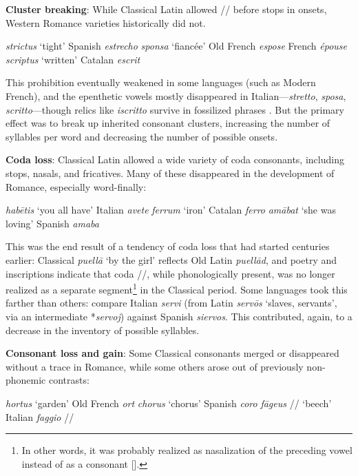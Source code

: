 \documentclass[12pt,twoside]{article}
\newcommand{\ipa}[1]{/\textipa{#1}/}
\newcommand{\ipab}[1]{[\textipa{#1}]}
\newcommand{\yields}{\textrightarrow}
\begin{document}
\textbf{Cluster breaking}: While Classical Latin allowed \ipa{s} before stops in onsets, Western Romance varieties historically did not.

\begin{exe}
\ex \emph{strictus} `tight' \yields{} Spanish \emph{estrecho}
\ex \emph{sponsa} `fiancée' \yields{} Old French \emph{espose} \yields{} French \emph{épouse}
\ex \emph{scriptus} `written' \yields{} Catalan \emph{escrit}
\end{exe}

This prohibition eventually weakened in some languages (such as Modern French), and the epenthetic vowels mostly disappeared in Italian---\emph{stretto}, \emph{sposa}, \emph{scritto}---though relics like \emph{iscritto} survive in fossilized phrases \citep{alkire}. But the primary effect was to break up inherited consonant clusters, increasing the number of syllables per word and decreasing the number of possible onsets.

\textbf{Coda loss}: Classical Latin allowed a wide variety of coda consonants, including stops, nasals, and fricatives. Many of these disappeared in the development of Romance, especially word-finally:

\begin{exe}
\ex \emph{hab\=etis} `you all have' \yields{} Italian \emph{avete}
\ex \emph{ferrum} `iron' \yields{} Catalan \emph{ferro}
\ex \emph{am\=abat} `she was loving' \yields{} Spanish \emph{amaba}
\end{exe}

This was the end result of a tendency of coda loss that had started centuries earlier: Classical \emph{puell\=a} `by the girl' reflects Old Latin \emph{puell\=ad}, and poetry and inscriptions indicate that coda \ipa{m}, while phonologically present, was no longer realized as a separate segment\footnote{In other words, it was probably realized as nasalization of the preceding vowel instead of as a consonant \ipab{m}.} in the Classical period. Some languages took this farther than others: compare Italian \emph{servi} (from Latin \emph{serv\=os} `slaves, servants', via an intermediate *\emph{servoj}) against Spanish \emph{siervos}. This contributed, again, to a decrease in the inventory of possible syllables.

\textbf{Consonant loss and gain}: Some Classical consonants merged or disappeared without a trace in Romance, while some others arose out of previously non-phonemic contrasts:

\begin{exe}
\ex \emph{hortus} `garden' \yields{} Old French \emph{ort}
\ex \emph{chorus} `chorus' \yields{} Spanish \emph{coro}
\ex \emph{f\=ageus} \ipa{fa:geus} `beech' \yields{} Italian \emph{faggio} \ipa{faddZo}
\end{exe}
\end{document}
